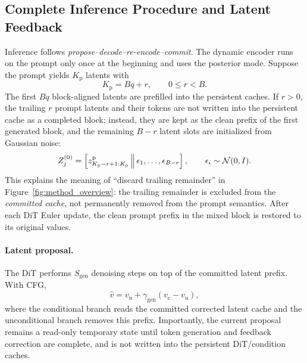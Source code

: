 \subsection{Complete Inference Procedure and Latent Feedback}
\label{app:inference-details}

Inference follows \emph{propose--decode--re-encode--commit}. The dynamic encoder runs on the prompt only once at the beginning and uses the posterior mode. Suppose the prompt yields $K_{\mathrm p}$ latents with
\begin{equation}
    K_{\mathrm p}=Bq+r,
    \qquad 0\le r<B.
    \label{eq:app-workflow-prompt-split}
\end{equation}
The first $Bq$ block-aligned latents are prefilled into the persistent caches. If $r>0$, the trailing $r$ prompt latents and their tokens are not written into the persistent cache as a completed block; instead, they are kept as the clean prefix of the first generated block, and the remaining $B-r$ latent slots are initialized from Gaussian noise:
\begin{equation}
    Z_j^{(0)}
    =\left[
      z^{\mathrm p}_{K_{\mathrm p}-r+1:K_{\mathrm p}}
      \,\middle\|\,
      \epsilon_1,\ldots,\epsilon_{B-r}
    \right],
    \qquad \epsilon_i\sim\mathcal{N}(0,I).
    \label{eq:app-workflow-first-block}
\end{equation}
This explains the meaning of ``discard trailing remainder'' in Figure~\ref{fig:method_overview}: the trailing remainder is excluded from the \emph{committed cache}, not permanently removed from the prompt semantics. After each DiT Euler update, the clean prompt prefix in the mixed block is restored to its original values.

\paragraph{Latent proposal.}
The DiT performs $S_{\mathrm{gen}}$ denoising steps on top of the committed latent prefix. With CFG,
\begin{equation}
    \hat v
    =v_{\mathrm u}+\gamma_{\mathrm{gen}}(v_{\mathrm c}-v_{\mathrm u}),
    \label{eq:app-workflow-gen-cfg}
\end{equation}
where the conditional branch reads the committed corrected latent cache and the unconditional branch removes this prefix. Importantly, the current proposal remains a read-only temporary state until token generation and feedback correction are complete, and is not written into the persistent DiT/condition caches.

